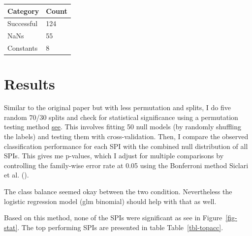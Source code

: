 \documentclass[
  man,
  longtable,
  nolmodern,
  notxfonts,
  notimes,
  colorlinks=true,linkcolor=blue,citecolor=blue,urlcolor=blue]{apa7}
\begin{document}
\begin{table}

{\caption{{SPI stats}{\label{tbl-spistats}}}
\vspace{-20pt}}

\begin{longtable}[]{@{}ll@{}}
\toprule\noalign{}
Category & Count \\
\midrule\noalign{}
\endhead
\bottomrule\noalign{}
\endlastfoot
Successful & 124 \\
NaNs & 55 \\
Constants & 8 \\
\end{longtable}

\end{table}

\section{Results}\label{results}

Similar to the original paper but with less permutation and splits, I do
five random 70/30 splits and check for statistical significance using a
permutation testing method
\href{https://bookdown.org/kmbm92/Applied-Biostats/perm1.html\#permute-to-generate-a-null-distribution}{see}.
This involves fitting 50 null models (by randomly shuffling the labels)
and testing them with cross-validation. Then, I compare the observed
classification performance for each SPI with the combined null
distribution of all SPIs. This gives me p-values, which I adjust for
multiple comparisons by controlling the family-wise error rate at 0.05
using the Bonferroni method Siclari et al.
().

The class balance seemed okay between the two condition. Nevertheless
the logistic regression model (glm binomial) should help with that as
well.

Based on this method, none of the SPIs were significant as see in
Figure~\ref{fig-stat}. The top performing SPIs are presented in table
Table~\ref{tbl-topacc}.
\end{document}

